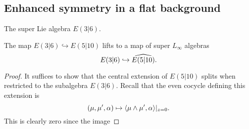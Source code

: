 \documentclass[11pt]{amsart}
\begin{document}
\subsection{Enhanced symmetry in a flat background}

\parsec[s:weight]


\parsec[s:e36]

The super Lie algebra $E(3|6)$. 

\begin{lem} 
The map $E(3|6) \hookrightarrow E(5|10)$ lifts to a map of super $L_\infty$ algebras 
\[
E(3|6) \hookrightarrow \Hat{E(5|10)} .
\]
\end{lem}
\begin{proof}
It suffices to show that the central extension of $E(5|10)$ splits when restricted to the subalgebra $E(3|6)$. 
Recall that the even cocycle defining this extension is 
\[
(\mu, \mu', \alpha) \mapsto \<\mu \wedge \mu' , \alpha\>|_{z=0} .
\]
This is clearly zero since the image 
\end{proof}
\end{document}
